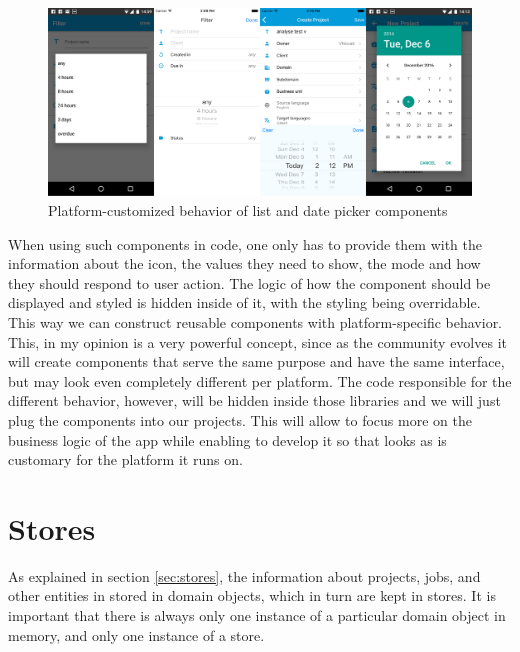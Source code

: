 \begin{figure}[H]
	\includegraphics[width=1\textwidth]{pics/components}
	\caption{Platform-customized behavior of list and date picker components}
	\label{components}
\end{figure}


When using such components in code, one only has to provide them with the information about the icon, the values they need to show, the mode and how they should respond to user action. The logic of how the component should be displayed and styled is hidden inside of it, with the styling being overridable. This way we can construct reusable components with platform-specific behavior. This, in my opinion is a very powerful concept, since as the community evolves it will create components that serve the same purpose and have the same interface, but may look even completely different per platform. The code responsible for the different behavior, however, will be hidden inside those libraries and we will just plug the components into our projects. This will allow to focus more on the business logic of the app while enabling to develop it so that looks as is customary for the platform it runs on.



\section{Stores}

As explained in section \ref{sec:stores}, the information about projects, jobs, and other entities in stored in domain objects, which in turn are kept in stores. It is important that there is always only one instance of a particular domain object in memory, and only one instance of a store.

